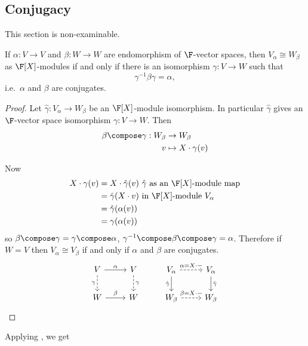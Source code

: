 \documentclass[a4paper]{article}
\theoremstyle{definition}
\begin{document}
\subsection{Conjugacy}

This section is non-examinable.

\begin{lemma}
  If \(\alpha: V \to V\) and \(\beta: W \to W\) are endomorphism of \(\F\)-vector spaces, then \(V_\alpha \cong W_\beta\) as \(\F[X]\)-modules if and only if there is an isomorphism \(\gamma: V \to W\) such that
  \[
    \gamma^{-1} \beta \gamma = \alpha,
  \]
  i.e.\ \(\alpha\) and \(\beta\) are conjugates.
\end{lemma}

\begin{proof}
  Let \(\hat \gamma: V_\alpha \to W_\beta\) be an \(\F[X]\)-module isomorphism. In particular \(\hat \gamma\) gives an \(\F\)-vector space isomorphism \(\gamma: V \to W\). Then
  \begin{align*}
    \beta \compose \gamma: W_\beta &\to W_\beta \\
    v &\mapsto X \cdot \gamma(v)
  \end{align*}

  Now
  \begin{align*}
    X \cdot \gamma(v) &= X \cdot \hat \gamma(v) \text{ \(\hat \gamma\) as an \(\F[X]\)-module map} \\
                      &= \hat \gamma(X \cdot v) \text{ in \(\F[X]\)-module \(V_\alpha\)} \\
                      &= \hat \gamma(\alpha(v)) \\
                      &= \gamma(\alpha(v))
  \end{align*}
  so \(\beta \compose \gamma = \gamma \compose \alpha\), \(\gamma^{-1} \compose \beta \compose \gamma = \alpha\). Therefore if \(W = V\) then \(V_\alpha \cong V_\beta\) if and only if \(\alpha\) and \(\beta\) are conjugates.
  \[
    \begin{tikzcd}
      V \ar[r, "\alpha"] \ar[d, dashed, "\gamma"'] & V \ar[d, dashed, "\gamma"] & V_\alpha \ar[r, dashed, "\alpha = X \cdot -"] \ar[d, "\hat \gamma"'] & V_\alpha \ar[d, "\hat \gamma"] \\
      W \ar[r, "\beta"] & W & W_\beta \ar[r, dashed, "\beta = X \cdot -"] & W_\beta
    \end{tikzcd}
  \]
\end{proof}

Applying , we get
\end{document}
